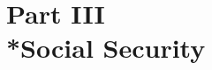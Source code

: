 \documentclass[12pt,a4paper]{article}
\begin{document}
\part[Part III --- Social Security]{Part III\\*Social Security}

\renewcommand\parthead{--- Part III}

%
%
%
%
%
%
%
%
%
%
%
%
%
\end{document}
